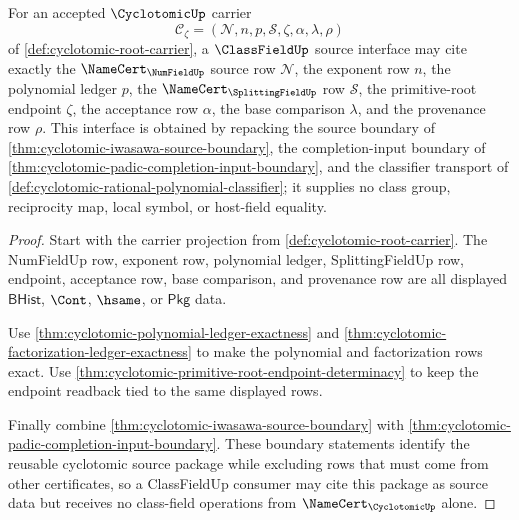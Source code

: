 \begin{theorem}
\label{thm:cyclotomic-classfield-source-interface}
For an accepted $\CyclotomicUp$ carrier
$$
\mathcal{C}_{\zeta}=(\mathcal{N},n,p,\mathcal{S},\zeta,\alpha,\lambda,\rho)
$$
of \autoref{def:cyclotomic-root-carrier}, a $\ClassFieldUp$ source interface may cite exactly the $\NameCert_{\NumFieldUp}$ source row $\mathcal{N}$, the exponent row $n$, the polynomial ledger $p$, the $\NameCert_{\SplittingFieldUp}$ row $\mathcal{S}$, the primitive-root endpoint $\zeta$, the acceptance row $\alpha$, the base comparison $\lambda$, and the provenance row $\rho$. This interface is obtained by repacking the source boundary of \autoref{thm:cyclotomic-iwasawa-source-boundary}, the completion-input boundary of \autoref{thm:cyclotomic-padic-completion-input-boundary}, and the classifier transport of \autoref{def:cyclotomic-rational-polynomial-classifier}; it supplies no class group, reciprocity map, local symbol, or host-field equality.
\end{theorem}
\begin{proof}
Start with the carrier projection from \autoref{def:cyclotomic-root-carrier}. The NumFieldUp row, exponent row, polynomial ledger, SplittingFieldUp row, endpoint, acceptance row, base comparison, and provenance row are all displayed $\mathsf{BHist}$, $\Cont$, $\hsame$, or $\mathsf{Pkg}$ data.

Use \autoref{thm:cyclotomic-polynomial-ledger-exactness} and \autoref{thm:cyclotomic-factorization-ledger-exactness} to make the polynomial and factorization rows exact. Use \autoref{thm:cyclotomic-primitive-root-endpoint-determinacy} to keep the endpoint readback tied to the same displayed rows.

Finally combine \autoref{thm:cyclotomic-iwasawa-source-boundary} with \autoref{thm:cyclotomic-padic-completion-input-boundary}. These boundary statements identify the reusable cyclotomic source package while excluding rows that must come from other certificates, so a ClassFieldUp consumer may cite this package as source data but receives no class-field operations from $\NameCert_{\CyclotomicUp}$ alone.
\end{proof}


